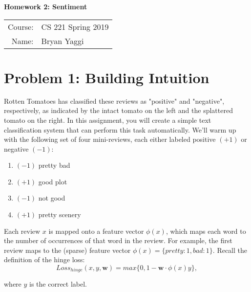 \documentclass[10pt]{article}
\begin{document}
\begin{center}
{\Large \textbf{Homework 2: Sentiment}}

\begin{tabular}{rl}
\\
Course: & CS 221 Spring 2019 \\
Name: & Bryan Yaggi
\end{tabular}
\end{center}

\section*{\normalsize Problem 1: Building Intuition}

Rotten Tomatoes has classified these reviews as "positive" and "negative", respectively, as indicated by the intact tomato on the left and the splattered tomato on the right. In this assignment, you will create a simple text classification system that can perform this task automatically. We'll warm up with the following set of four mini-reviews, each either labeled positive $(+1)$ or negative $(-1)$:

	\begin{enumerate}
		\item $(-1)$ pretty bad
		\item $(+1)$ good plot
		\item $(-1)$ not good
		\item $(+1)$ pretty scenery
	\end{enumerate}
	
Each review $x$ is mapped onto a feature vector $\phi(x)$, which maps each word to the number of occurrences of that word in the review. For example, the first review maps to the (sparse) feature vector $\phi(x)=\{pretty:1,bad:1\}$. Recall the definition of the hinge loss:
$$Loss_{hinge}(x, y, \mathbf{w}) = max\{ 0, 1 - \mathbf{w} \cdot \phi(x)y \},$$

where $y$ is the correct label.
\end{document}
